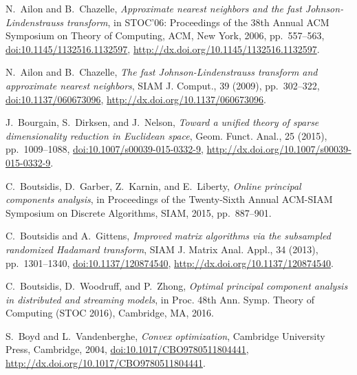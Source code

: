 \documentclass[final]{siamart1116}
\numberwithin{equation}{section}
\numberwithin{theorem}{section}
\numberwithin{figure}{section}
\begin{document}

\begin{thebibliography}{10}

{\sc N.~Ailon and B.~Chazelle}, {\em Approximate nearest neighbors and the fast
  {J}ohnson-{L}indenstrauss transform}, in S{TOC}'06: {P}roceedings of the 38th
  {A}nnual {ACM} {S}ymposium on {T}heory of {C}omputing, ACM, New York, 2006,
  pp.~557--563, \href{http://dx.doi.org/10.1145/1132516.1132597}
  {doi:10.1145/1132516.1132597},
  \url{http://dx.doi.org/10.1145/1132516.1132597}.

{\sc N.~Ailon and B.~Chazelle}, {\em The fast {J}ohnson-{L}indenstrauss
  transform and approximate nearest neighbors}, SIAM J. Comput., 39 (2009),
  pp.~302--322, \href{http://dx.doi.org/10.1137/060673096}
  {doi:10.1137/060673096}, \url{http://dx.doi.org/10.1137/060673096}.

{\sc J.~Bourgain, S.~Dirksen, and J.~Nelson}, {\em Toward a unified theory of
  sparse dimensionality reduction in {E}uclidean space}, Geom. Funct. Anal., 25
  (2015), pp.~1009--1088, \href{http://dx.doi.org/10.1007/s00039-015-0332-9}
  {doi:10.1007/s00039-015-0332-9},
  \url{http://dx.doi.org/10.1007/s00039-015-0332-9}.

{\sc C.~Boutsidis, D.~Garber, Z.~Karnin, and E.~Liberty}, {\em Online principal
  components analysis}, in Proceedings of the Twenty-Sixth Annual ACM-SIAM
  Symposium on Discrete Algorithms, SIAM, 2015, pp.~887--901.

{\sc C.~Boutsidis and A.~Gittens}, {\em Improved matrix algorithms via the
  subsampled randomized {H}adamard transform}, SIAM J. Matrix Anal. Appl., 34
  (2013), pp.~1301--1340, \href{http://dx.doi.org/10.1137/120874540}
  {doi:10.1137/120874540}, \url{http://dx.doi.org/10.1137/120874540}.

{\sc C.~Boutsidis, D.~Woodruff, and P.~Zhong}, {\em Optimal principal component
  analysis in distributed and streaming models}, in Proc. 48th Ann. Symp.
  Theory of Computing (STOC 2016), Cambridge, MA, 2016.

{\sc S.~Boyd and L.~Vandenberghe}, {\em Convex optimization}, Cambridge
  University Press, Cambridge, 2004,
  \href{http://dx.doi.org/10.1017/CBO9780511804441}
  {doi:10.1017/CBO9780511804441},
  \url{http://dx.doi.org/10.1017/CBO9780511804441}.


\end{thebibliography}
\end{document}

